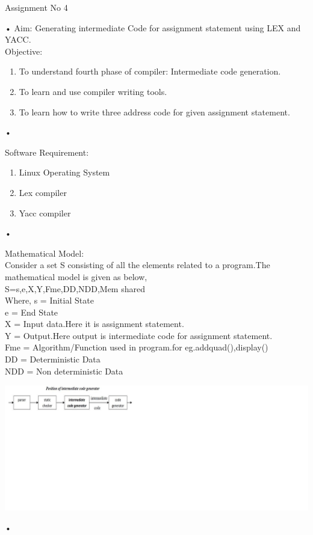 \documentclass[11pt]{article}
\begin{document}
	\begin{center}
		\begin{Large}
			Assignment No 4
		\end{Large}
	\end{center}•
	Aim: Generating intermediate Code for assignment statement using LEX and YACC.\\
	
	\noindent
	Objective:
	\begin{enumerate}
		\item To understand fourth phase of compiler: Intermediate code generation.
		\item To learn and use compiler writing tools.
		\item To learn how to write three address code for given assignment statement.
	\end{enumerate}•
	
	\noindent
	Software Requirement:
	\begin{enumerate}
		\item Linux Operating System
		\item Lex compiler
		\item Yacc compiler
	\end{enumerate}•
	
	\noindent
	Mathematical Model:\\
	Consider a set S consisting of all the elements related to a program.The mathematical model is given as below,\\
	S={s,e,X,Y,Fme,DD,NDD,Mem shared}\\ Where, s = Initial State \\e = End State\\
	X	= Input data.Here it is assignment statement.\\
	Y	= Output.Here output is intermediate code for assignment statement.\\
	Fme = Algorithm/Function used in program.for eg.{addquad(),display()}\\
	DD = Deterministic Data\\
	NDD = Non deterministic Data\\
	
	
	\begin{center}\includegraphics{temp.png}
	\end{center}•
	
\end{document}
